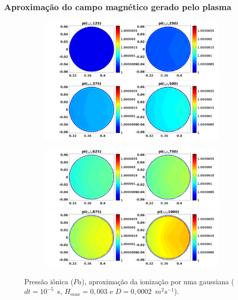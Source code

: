 \begin{frame}		
\frametitle{ Aproximação do campo magnético gerado pelo plasma}
\begin{figure}[H]
\begin{subfigure}{0.43\textwidth}
\includegraphics[scale=0.24]{../SImulacao_breakdown/PDE/pitod1B9.png}  
\includegraphics[scale=0.24]{../SImulacao_breakdown/PDE/pitod2B9.png} 
\end{subfigure}
\begin{subfigure}{0.43\textwidth}
\includegraphics[scale=0.24]{../SImulacao_breakdown/PDE/pitod3B9.png} 
\includegraphics[scale=0.24]{../SImulacao_breakdown/PDE/pitod4B9.png} 
\end{subfigure}
\caption{Pressão iônica ($Pa$), aproximação da ionização por uma gaussiana ($dt=10^{-5}$\ s, $H_{max} = 0,003$ e $D=0,0002$\ $m^2s^{-1}$).}
\end{figure}


\end{frame}
